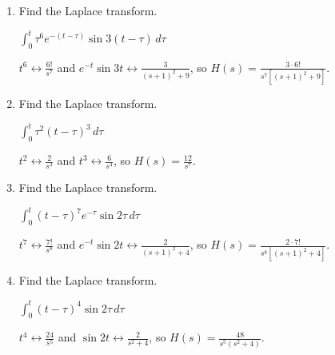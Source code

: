 \documentclass{ximera}
\begin{document}
\begin{problem}
\begin{enumerate}
\item Find the Laplace transform. 

$\int_0^t\tau^6
e^{-(t-\tau)}\sin 3(t-\tau)\,d\tau$

\begin{solution}
 $t^6\leftrightarrow \frac{6!}{s^7}$ and
$e^{-t}\sin3t \leftrightarrow\frac{3}{(s+1)^2+9}$, so
$H(s)=\frac{3\cdot 6!}{s^7\left[(s+1)^2+
9\right]}$.
\end{solution}

\item Find the Laplace transform. 

$\int_0^t\tau^2 (t-\tau)^3\,
d\tau$

\begin{solution}
$t^2\leftrightarrow\frac{2}{s^3}$ and
$t^3\leftrightarrow\frac{6}{s^4}$, so
 $H(s)=\frac{12}{s^7}$.
\end{solution}

\item Find the Laplace transform. 

$\int_0^t (t-\tau)^7 e^{-\tau}
\sin 2\tau\,d\tau$

\begin{solution}
$t^7\leftrightarrow\frac{7!}{s^8}$ and
$e^{-t}\sin2t \leftrightarrow\frac{2}{(s+1)^2+4}$, so
  $H(s)=\frac{2\cdot 7!}{s^8\left[(s+1)^2+
4\right]}$.
\end{solution}

\item Find the Laplace transform. 

$\int_0^t (t-\tau)^4\sin
2\tau\,d\tau$

\begin{solution}
$t^4\leftrightarrow\frac{24}{s^5}$ and
$\sin2t\leftrightarrow\frac{2}{s^2+4}$, so
 $H(s)=\frac{48}{s^5(s^2+4)}$.
\end{solution}
\end{enumerate}
\end{problem}
\end{document}
